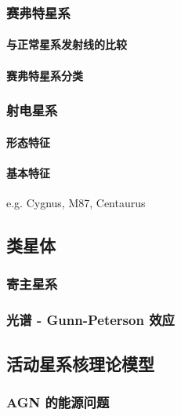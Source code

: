 \subsubsection{赛弗特星系}

\paragraph{与正常星系发射线的比较}

\paragraph{赛弗特星系分类}

\subsubsection{射电星系}

\paragraph{形态特征}

\paragraph{基本特征}

e.g. Cygnus, M87, Centaurus

\subsection{类星体}

\subsubsection{寄主星系}

\subsubsection{光谱 - Gunn-Peterson 效应}

\subsection{活动星系核理论模型}

\subsubsection{AGN 的能源问题}

